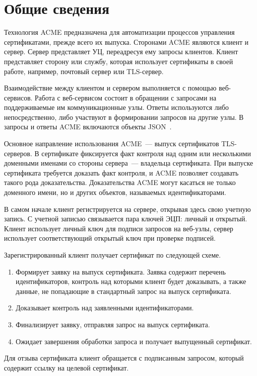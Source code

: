 \section{Общие сведения}\label{ACME.Intro}

Технология ACME предназначена для автоматизации процессов управления 
сертификатами, прежде всего их выпуска. Сторонами ACME являются клиент и 
сервер. Сервер представляет УЦ, переадресуя ему запросы клиентов. Клиент
представляет сторону или службу, которая использует сертификаты в своей 
работе, например, почтовый сервер или TLS-сервер.

Взаимодействие между клиентом и сервером выполняется с помощью веб-сервисов.
Работа с веб-сервисом состоит в обращении с запросами на поддерживаемые им 
коммуникационные узлы. Ответы используются либо непосредственно, либо участвуют 
в формировании запросов на другие узлы. В запросы и ответы ACME включаются 
объекты JSON~\cite{JSON}.

Основное направление использования ACME~--- выпуск сертификатов TLS-серверов. В
сертификате фиксируется факт контроля над одним или несколькими доменными
именами со стороны сервера~--- владельца сертификата. При выпуске
сертификата требуется доказать факт контроля, и ACME позволяет создавать такого
рода доказательства. Доказательства ACME могут касаться не только
доменного имени, но и других объектов, называемых идентификаторами.

В самом начале клиент регистрируется на сервере, открывая здесь свою учетную
запись. С учетной записью связывается пара ключей ЭЦП: личный и открытый. Клиент
использует личный ключ для подписи запросов на веб-узлы, сервер использует
соответствующий открытый ключ при проверке подписей.

Зарегистрированный клиент получает сертификат по следующей схеме.

\begin{enumerate}
\item
Формирует заявку на выпуск сертификата. Заявка содержит перечень
идентификаторов, контроль над которыми клиент будет доказывать, а также данные,
не попадающие в стандартный запрос на выпуск сертификата.

\item
Доказывает контроль над заявленными идентификаторами.

\item
Финализирует заявку, отправляя запрос на выпуск сертификата.

\item
Ожидает завершения обработки запроса и получает выпущенный сертификат.
\end{enumerate}

Для отзыва сертификата клиент обращается с подписанным запросом, который
содержит ссылку на целевой сертификат.
